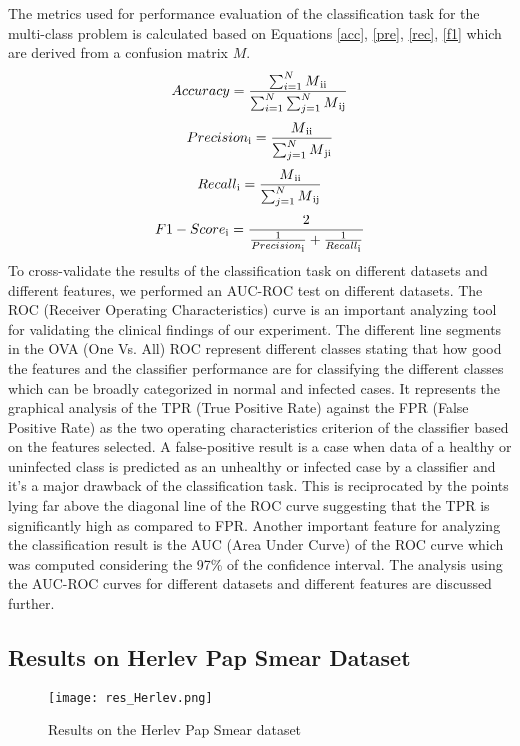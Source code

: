 \documentclass{llncs}
\begin{document}
The metrics used for performance evaluation of the classification task for the multi-class problem is calculated based on Equations \ref{acc}, \ref{pre}, \ref{rec}, \ref{f1} which are derived from a confusion matrix $M$.
\begin{equation}
Accuracy = \frac{\sum_{i=1}^{N}M\textsubscript{ii}}{\sum_{i=1}^{N}\sum_{j=1}^{N}M\textsubscript{ij}}
\label{acc}
\end{equation}
\begin{equation}
Precision\textsubscript{i} = \frac{M\textsubscript{ii}}{\sum_{j=1}^{N}M\textsubscript{ji}}
\label{pre}
\end{equation}
\begin{equation}
Recall\textsubscript{i} = \frac{M\textsubscript{ii}}{\sum_{j=1}^{N}M\textsubscript{ij}}
\label{rec}
\end{equation}
\begin{equation}
F1-Score\textsubscript{i} = \frac{2}{\frac{1}{Precision\textsubscript{i}}+\frac{1}{Recall\textsubscript{i}}}
\label{f1}
\end{equation}
To cross-validate the results of the classification task on different datasets and different features, we performed an AUC-ROC test on different datasets. The ROC (Receiver Operating Characteristics) curve is an important analyzing tool for validating the clinical findings of our experiment. The different line segments in the OVA (One Vs. All) ROC represent different classes stating that how good the features and the classifier performance are for classifying the different classes which can be broadly categorized in normal and infected cases. It represents the graphical analysis of the TPR (True Positive Rate) against the FPR (False Positive Rate) as the two operating characteristics criterion of the classifier based on the features selected. A false-positive result is a case when data of a healthy or uninfected class is predicted as an unhealthy or infected case by a classifier and it’s a major drawback of the classification task. This is reciprocated by the points lying far above the diagonal line of the ROC curve suggesting that the TPR is significantly high as compared to FPR. Another important feature for analyzing the classification result is the AUC (Area Under Curve) of the ROC curve which was computed considering the 97\% of the confidence interval. The analysis using the AUC-ROC curves for different datasets and different features are discussed further.

\subsection{Results on Herlev Pap Smear Dataset}
\begin{figure*}
\begin{adjustwidth}{-2cm}{}
    \centering
    \texttt{[image: res\_Herlev.png]}
    \caption{Results on the Herlev Pap Smear dataset}
    \label{res_Herlev}
\end{adjustwidth}
\end{figure*}
\end{document}
